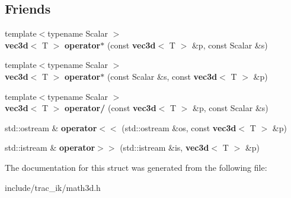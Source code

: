 \subsection*{Friends}
\begin{DoxyCompactItemize}
\item 
{\footnotesize template$<$typename Scalar $>$ }\\{\bf vec3d}$<$ T $>$ {\bfseries operator$\ast$} (const {\bf vec3d}$<$ T $>$ \&p, const Scalar \&s)\label{structmath3d_1_1vec3d_a90f5d14e018ba0af49b8e42ac05f0332}

\item 
{\footnotesize template$<$typename Scalar $>$ }\\{\bf vec3d}$<$ T $>$ {\bfseries operator$\ast$} (const Scalar \&s, const {\bf vec3d}$<$ T $>$ \&p)\label{structmath3d_1_1vec3d_a494bc797b53db59c392dd32a04177176}

\item 
{\footnotesize template$<$typename Scalar $>$ }\\{\bf vec3d}$<$ T $>$ {\bfseries operator/} (const {\bf vec3d}$<$ T $>$ \&p, const Scalar \&s)\label{structmath3d_1_1vec3d_a4291c2d36d9af1d5aa56f163947282fe}

\item 
std\-::ostream \& {\bfseries operator$<$$<$} (std\-::ostream \&os, const {\bf vec3d}$<$ T $>$ \&p)\label{structmath3d_1_1vec3d_ae0eafe2f2679d5a343477e68096f1439}

\item 
std\-::istream \& {\bfseries operator$>$$>$} (std\-::istream \&is, {\bf vec3d}$<$ T $>$ \&p)\label{structmath3d_1_1vec3d_aed4695fbef265668a232a8981b11f184}

\end{DoxyCompactItemize}


The documentation for this struct was generated from the following file\-:\begin{DoxyCompactItemize}
\item 
include/trac\-\_\-ik/math3d.\-h\end{DoxyCompactItemize}
